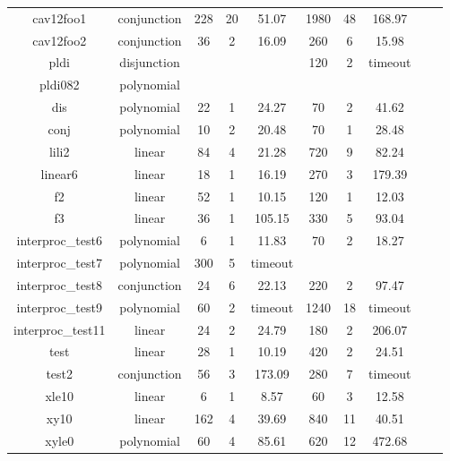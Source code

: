 \begin{table}[t]
\begin{tabular}{l c | c c c | c c c | c c }
\hline
\multicolumn{1}{|c|}{cav12foo1}         									&conjunction 	&228 &20 &51.07	&1980 &48 &168.97  & &  \\
\multicolumn{1}{|c|}{cav12foo2}         									&conjunction 	&36  &2 &16.09	&260 &6 &15.98  & &  \\
\multicolumn{1}{|c|}{pldi} 		        									&disjunction 	& & &  &120  &2  &timeout  & &  \\
\multicolumn{1}{|c|}{pldi082} 		        								&polynomial 	& & &  &  &  &  & &  \\

\hline
\multicolumn{1}{|c|}{dis}         											&polynomial 	&22  &1 &24.27  &70   &2 &41.62  & &  \\
\multicolumn{1}{|c|}{conj}         											&polynomial 	&10 &2 &20.48		&70 &1 &28.48  & &  \\
\multicolumn{1}{|c|}{lili2}         										&linear 		&84 &4 &21.28  &720  &9  &82.24  & &  \\
\multicolumn{1}{|c|}{linear6}         										&linear 		&18 &1 &16.19  &270 &3  &179.39  & &  \\
\multicolumn{1}{|c|}{f2}         											&linear 		&52 &1 &10.15  &120 &1   &12.03  & &  \\
\multicolumn{1}{|c|}{f3}         											&linear 		&36 &1 &105.15  &330  &5  &93.04  & &  \\
\multicolumn{1}{|c|}{interproc\_test6}         								&polynomial 	&6 &1 &11.83  &70  &2  &18.27  & &  \\
\multicolumn{1}{|c|}{interproc\_test7}         								&polynomial 	&300 &5 &timeout  &  &  & &  \\
\multicolumn{1}{|c|}{interproc\_test8}         								&conjunction 	&24 &6 &22.13  &220  &2  &97.47  & &  \\
\multicolumn{1}{|c|}{interproc\_test9}         								&polynomial 	&60 &2 &timeout  &1240  &18  &timeout  & &  \\
\multicolumn{1}{|c|}{interproc\_test11}         							&linear 		&24 &2 &24.79  &180 &2   &206.07  & &  \\

\multicolumn{1}{|c|}{test}         											&linear 		&28 &1 &10.19  &420 &2  &24.51  & &  \\
\multicolumn{1}{|c|}{test2}         										&conjunction 	&56 &3 &173.09  &280  &7  &timeout  & &  \\
\multicolumn{1}{|c|}{xle10}         										&linear 		&6 &1 &8.57  &60 &3   &12.58  & &  \\
\multicolumn{1}{|c|}{xy10}         											&linear 		&162 &4 &39.69  &840  &11  &40.51  & &  \\
\multicolumn{1}{|c|}{xyle0}         										&polynomial 	&60 &4 &85.61  &620   &12 &472.68  & &  \\
\hline
\end{tabular}
\label{tbl:stats}
\end{table}

